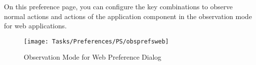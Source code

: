 
On this preference page, you can configure the key combinations to observe normal actions and actions of the application component in the observation mode for web applications. 

\begin{figure}[h]
\begin{center}
\texttt{[image: Tasks/Preferences/PS/obsprefsweb]}
\caption{Observation Mode for Web Preference Dialog}
\label{obsprefsweb}
\end{center}
\end{figure}
